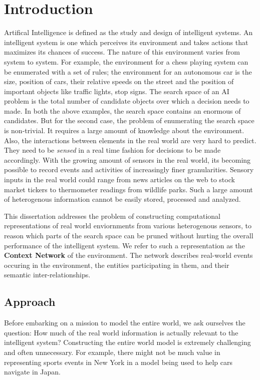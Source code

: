 \chapter{Introduction}

Artifical Intelligence is defined as the study and design of intelligent systems. An intelligent system is one which perceives its environment and takes actions that maximizes its chances of success. The nature of this environment varies from system to system. For example, the environment for a chess playing system can be enumerated with a set of rules; the environment for an autonomous car is the size, position of cars, their relative speeds on the street and the position of important objects like traffic lights, stop signs. The search space of an AI problem is the total number of candidate objects over which a decision needs to made. In both the above examples, the search space contains an enormous of candidates. But for the second case, the problem of enumerating the search space is non-trivial. It requires a large amount of knowledge about the environment. Also, the interactions between elements in the real world are very hard to predict. They need to be \textit{sensed} in a real time fashion for decisions to be made accordingly. With the growing amount of sensors in the real world, its becoming possible to record events and activities of increasingly finer granularities. Sensory inputs in the real world could range from news articles on the web to stock market tickers to thermometer readings from wildlife parks. Such a large amount of heterogenous information cannot be easily stored, processed and analyzed. 

This dissertation addresses the problem of constructing computational representations of real world enviornments from various heterogenous sensors, to reason which parts of the search space can be pruned without hurting the overall performance of the intelligent system. We refer to such a representation as the \textbf{Context Network} of the environment. The network describes real-world events occuring in the environment, the entities participating in them, and their semantic inter-relationships.

\section{Approach}
Before embarking on a mission to model the entire world, we ask ourselves the question: How much of the real world information is actually relevant to the intelligent system? Constructing the entire world model is extremely challenging and often unnecessary. For example, there might not be much value in representing sports events in New York in a model being used to help cars navigate in Japan. 

